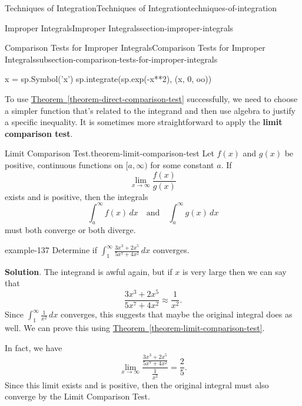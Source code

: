 \documentclass[oneside,10pt,]{book}
\newcommand{\terminology}[1]{\textbf{#1}}
\numberwithin{equation}{section}
\begin{document}
\begin{chapterptx}{Techniques of Integration}{}{Techniques of Integration}{}{}{techniques-of-integration}
\begin{sectionptx}{Improper Integrals}{}{Improper Integrals}{}{}{section-improper-integrals}
\begin{subsectionptx}{Comparison Tests for Improper Integrals}{}{Comparison Tests for Improper Integrals}{}{}{subsection-comparison-tests-for-improper-integrals}
\begin{sageinput}
x = sp.Symbol('x')
sp.integrate(sp.exp(-x**2), (x, 0, oo))
\end{sageinput}
\hypertarget{p-608}{}%
To use \hyperref[theorem-direct-comparison-test]{Theorem~\ref{theorem-direct-comparison-test}} successfully, we need to choose a simpler function that's related to the integrand and then use algebra to justify a specific inequality. It is sometimes more straightforward to apply the \terminology{limit comparison test}.%
\begin{theorem}{Limit Comparison Test.}{}{theorem-limit-comparison-test}%
\hypertarget{p-609}{}%
Let \(f(x)\) and \(g(x)\) be positive, continuous functions on \([a,\infty)\) for some constant \(a\). If%
\begin{equation*}
\lim_{x\to\infty}\frac{f(x)}{g(x)}
\end{equation*}
exists and is positive, then the integrals%
\begin{equation*}
\int_{a}^{\infty}f(x)\,dx\quad\text{and}\quad\int_{a}^{\infty}g(x)\,dx
\end{equation*}
must both converge or both diverge.%
\end{theorem}
\begin{example}{}{example-137}%
\hypertarget{p-610}{}%
Determine if \(\displaystyle\int_{1}^{\infty}\frac{3x^{3} + 2x^{5}}{5x^{7} + 4x^{2}}\,dx\) converges.%
\par\smallskip%
\noindent\textbf{Solution}.\hypertarget{solution-133}{}\quad%
\hypertarget{p-611}{}%
The integrand is awful again, but if \(x\) is very large then we can say that%
\begin{equation*}
\frac{3x^{3} + 2x^{5}}{5x^{7} + 4x^{2}} \approx \frac{1}{x^{2}}.
\end{equation*}
Since \(\int_{1}^{\infty}\frac{1}{x^{2}}\,dx\) converges, this suggests that maybe the original integral does as well. We can prove this using \hyperref[theorem-limit-comparison-test]{Theorem~\ref{theorem-limit-comparison-test}}.%
\par
\hypertarget{p-612}{}%
In fact, we have%
\begin{equation*}
\lim_{x\to\infty}\frac{\frac{3x^{3} + 2x^{5}}{5x^{7} + 4x^{2}}}{\frac{1}{x^{2}}} = \frac{2}{5}.
\end{equation*}
Since this limit exists and is positive, then the original integral must also converge by the Limit Comparison Test.%
\end{example}
\end{subsectionptx}
\end{sectionptx}
\end{chapterptx}
\end{document}
